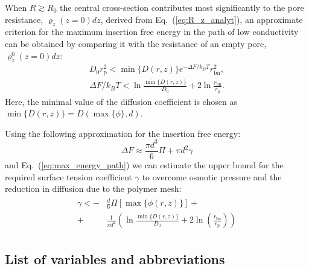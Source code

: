 \documentclass[10pt, a4paper]{article}
\begin{document}
\begin{multicols}{2}
When $R \gtrsim R_{0}$ the central cross-section contributes most significantly to the pore resistance, $\varrho_{z}(z=0)dz$, derived from Eq.~(\ref{eq:R_z_analyt}),
an approximate criterion for the maximum insertion free energy in the path of low conductivity can be obtained by comparing it with the resistance of an empty pore, $\varrho_{z}^{0}(z=0)dz$:
\begin{eqnarray}
    D_0 r_{\text{p}}^{2} < \min\{D(r,z)\} e^{-\Delta F / k_B T} r_{\text{bn}}^2, \\
    \label{eq:max_energy_path}
    \Delta F / k_B T < \ln \frac{\min\{D(r,z)\}}{D_0} + 2 \ln \frac{r_{\text{bn}}}{r_{\text{p}}}.
\end{eqnarray}
Here, the minimal value of the diffusion coefficient is chosen as $\min\{D(r,z)\} = D(\max\{\phi\}, d)$.

Using the following approximation for the insertion free energy:
\begin{equation}
    \label{eq:fe_approx}
    \Delta F \approx \frac{\pi d^3}{6} \Pi + \pi d^2 \gamma
\end{equation}
and Eq.~({\ref{eq:max_energy_path}}) 
we can estimate the upper bound for the required surface tension coefficient $\gamma$ to overcome osmotic pressure and the reduction in diffusion due to the polymer mesh:
\begin{eqnarray}
    \label{eq:gamma_crit}
    \begin{aligned}
        \gamma < - &\frac{d}{6}\Pi\left[\max\{\phi(r,z)\}\right] + \\
        +&\frac{1}{\pi d^2} \left( \ln\frac{\min\{D(r,z)\}}{D_0} + 2\ln\left( \frac{r_{\text{bn}}}{r_{\text{p}}} \right) \right)
    \end{aligned}
\end{eqnarray}
\end{multicols}

\pagebreak
\subsection*{List of variables and abbreviations}
\end{document}
